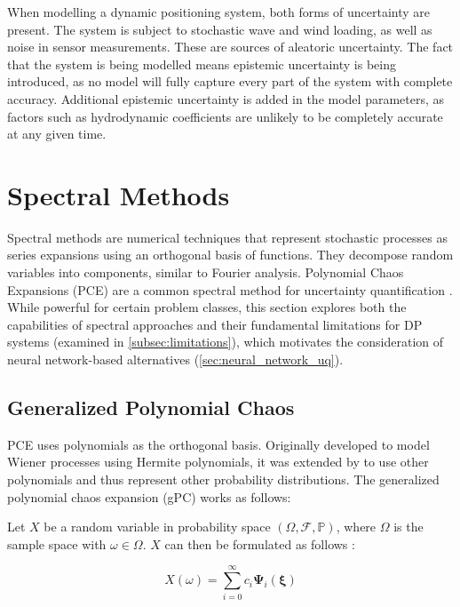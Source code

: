 When modelling a dynamic positioning system, both forms of uncertainty are present. The system is subject to stochastic
wave and wind loading, as well as noise in sensor measurements. These are sources of aleatoric uncertainty. The fact
that the system is being modelled means epistemic uncertainty is being introduced, as no model will fully capture every
part of the system with complete accuracy. Additional epistemic uncertainty is added in the model parameters, as factors
such as hydrodynamic coefficients are unlikely to be completely accurate at any given time.  

\section{Spectral Methods}
\label{sec:spectral_methods}
Spectral methods are numerical techniques that represent stochastic processes as series expansions using an orthogonal
basis of functions. They decompose random variables into components, similar to Fourier analysis. Polynomial Chaos Expansions (PCE) are a common spectral method for
uncertainty quantification \parencite{heuvelineHybridGeneralizedPolynomial2014}. While powerful for certain problem classes, this section explores both the capabilities of spectral approaches and their fundamental limitations for DP systems (examined in \cref{subsec:limitations}), which motivates the consideration of neural network-based alternatives (\cref{sec:neural_network_uq}).

\subsection{Generalized Polynomial Chaos}
\label{subsec:gPC}
PCE uses polynomials as the orthogonal basis. Originally developed to model Wiener processes using Hermite polynomials, it was extended by
\textcite{xiuWienerAskeyPolynomial2002} to use other polynomials and thus represent other probability distributions. The
generalized polynomial chaos expansion (gPC) works as follows:

Let \(X\) be a random variable in probability space \(\left(\Omega, \mathcal{F}, \mathbb{P}\right)\), where \(\Omega\) is
the sample space with \(\omega \in \Omega\). \(X\) can then be formulated as follows
\parencite{heuvelineHybridGeneralizedPolynomial2014}:

\begin{equation}
\label{eq:gPC_explain_X}
X(\omega) = \sum_{i = 0}^{\infty}c_i\boldsymbol{\Psi}_i(\boldsymbol{\xi})
\end{equation}


